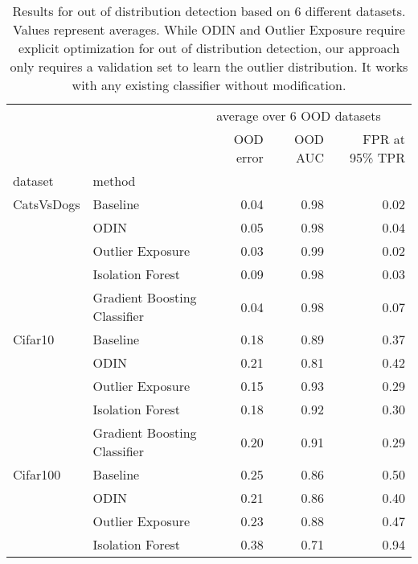 \begin{table}
\centering
\caption{Results for out of distribution detection based on 6 different datasets. Values represent averages. While ODIN and Outlier Exposure require explicit optimization for out of distribution detection, our approach only requires a validation set to learn the outlier distribution. It works with any existing classifier without modification.}
\label{aggOODResult}
\begin{tabular}{llrrr}
\toprule
        &                              & \multicolumn{3}{l}{average over 6 OOD datasets} \\
        &                              &                   OOD error & OOD AUC & FPR at 95\% TPR \\
dataset & method &                             &         &                \\
\midrule
CatsVsDogs & Baseline &                        0.04 &    0.98 &           0.02 \\
        & ODIN &                        0.05 &    0.98 &           0.04 \\
        & Outlier Exposure &                        0.03 &    0.99 &           0.02 \\
        & Isolation Forest &                        0.09 &    0.98 &           0.03 \\
        & Gradient Boosting Classifier &                        0.04 &    0.98 &           0.07 \\
Cifar10 & Baseline &                        0.18 &    0.89 &           0.37 \\
        & ODIN &                        0.21 &    0.81 &           0.42 \\
        & Outlier Exposure &                        0.15 &    0.93 &           0.29 \\
        & Isolation Forest &                        0.18 &    0.92 &           0.30 \\
        & Gradient Boosting Classifier &                        0.20 &    0.91 &           0.29 \\
Cifar100 & Baseline &                        0.25 &    0.86 &           0.50 \\
        & ODIN &                        0.21 &    0.86 &           0.40 \\
        & Outlier Exposure &                        0.23 &    0.88 &           0.47 \\
        & Isolation Forest &                        0.38 &    0.71 &           0.94 \\

\end{tabular}
\end{table}
